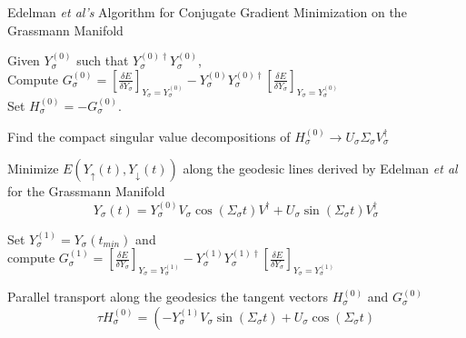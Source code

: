 \begin{algorithm}{Edelman {\it et al's} Algorithm for Conjugate Gradient
                  Minimization on the Grassmann Manifold}
                   
\label{algorithm:grassmann}
   \item Given $Y_{\sigma}^{(0)}$ such that 
               $Y_{\sigma}^{(0)\dag}Y_{\sigma}^{(0)}$,\\
               Compute $G_{\sigma}^{(0)} 
                        = \left[\frac{\delta E}{\delta Y_{\sigma}}
                          \right]_{Y_{\sigma}=Y_{\sigma}^{(0)}}
               -  Y_{\sigma}^{(0)}Y_{\sigma}^{(0) \dag} 
                         \left[\frac{\delta E}{\delta Y_{\sigma}}
                          \right]_{Y_{\sigma}=Y_{\sigma}^{(0)}}$ \\
               Set $H_{\sigma}^{(0)} = -G_{\sigma}^{(0)}$.
   \item Find the compact singular value decompositions of 
           $H_{\sigma}^{(0)} \rightarrow 
                U_{\sigma} \Sigma_{\sigma} V_{\sigma}^{\dag}$
   \item Minimize $E\left(Y_{\uparrow}(t), Y_{\downarrow}(t) \right)$ along the 
         geodesic lines derived by Edelman {\it et al} for the 
         Grassmann Manifold\\
        \begin{equation}
          Y_{\sigma}(t) = Y_{\sigma}^{(0)} V_{\sigma} 
                             \cos \left(\Sigma_{\sigma} t \right) V^{\dag}
           + U_{\sigma} \sin \left(\Sigma_{\sigma} t \right) V_{\sigma}^{\dag}
         \label{grass:1}
        \end{equation}
   \item Set $Y_{\sigma}^{(1)} = Y_{\sigma}(t_{min})$ and\\
         compute $G_{\sigma}^{(1)} 
                        = \left[\frac{\delta E}{\delta Y_{\sigma}}
                          \right]_{Y_{\sigma}=Y_{\sigma}^{(1)}}
               -  Y_{\sigma}^{(1)}Y_{\sigma}^{(1) \dag} 
                         \left[\frac{\delta E}{\delta Y_{\sigma}}
                          \right]_{Y_{\sigma}=Y_{\sigma}^{(1)}}$ 
   \item Parallel transport along the geodesics the tangent vectors
         $H_{\sigma}^{(0)}$ and $G_{\sigma}^{(0)}$
        \begin{equation}
          \tau H_{\sigma}^{(0)} = 
            \left( -Y_{\sigma}^{(1)} V_{\sigma} 
                     \sin \left(\Sigma_{\sigma} t \right)
           + U_{\sigma} \cos \left(\Sigma_{\sigma} t \right) 

\end{equation}
\end{algorithm}
